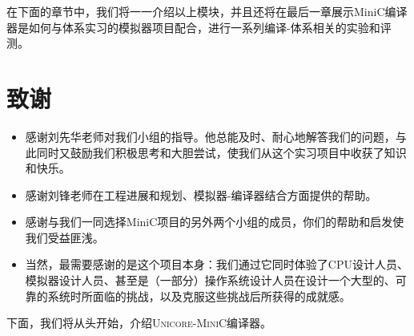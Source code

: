 在下面的章节中，我们将一一介绍以上模块，并且还将在最后一章展示MiniC编译器是如何与体系实习的模拟器项目配合，进行一系列编译-体系相关的实验和评测。

\section*{致谢}
\begin{itemize}
\item 感谢刘先华老师对我们小组的指导。他总能及时、耐心地解答我们的问题，与此同时又鼓励我们积极思考和大胆尝试，使我们从这个实习项目中收获了知识和快乐。

\item 感谢刘锋老师在工程进展和规划、模拟器-编译器结合方面提供的帮助。

\item 感谢与我们一同选择MiniC项目的另外两个小组的成员，你们的帮助和启发使我们受益匪浅。

\item 当然，最需要感谢的是这个项目本身：我们通过它同时体验了CPU设计人员、模拟器设计人员、甚至是（一部分）操作系统设计人员在设计一个大型的、可靠的系统时所面临的挑战，以及克服这些挑战后所获得的成就感。
\end{itemize}

下面，我们将从头开始，介绍\textsc{Unicore-MiniC}编译器。

